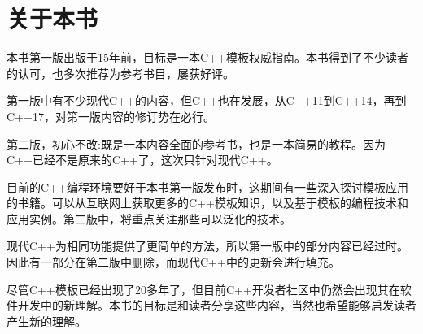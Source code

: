 \chapter{关于本书}

本书第一版出版于15年前，目标是一本C++模板权威指南。本书得到了不少读者的认可，也多次推荐为参考书目，屡获好评。

第一版中有不少现代C++的内容，但C++也在发展，从C++11到C++14，再到C++17，对第一版内容的修订势在必行。

第二版，初心不改:既是一本内容全面的参考书，也是一本简易的教程。因为C++已经不是原来的C++了，这次只针对现代C++。

目前的C++编程环境要好于本书第一版发布时，这期间有一些深入探讨模板应用的书籍。可以从互联网上获取更多的C++模板知识，以及基于模板的编程技术和应用实例。第二版中，将重点关注那些可以泛化的技术。

现代C++为相同功能提供了更简单的方法，所以第一版中的部分内容已经过时。因此有一部分在第二版中删除，而现代C++中的更新会进行填充。

尽管C++模板已经出现了20多年了，但目前C++开发者社区中仍然会出现其在软件开发中的新理解。本书的目标是和读者分享这些内容，当然也希望能够启发读者产生新的理解。